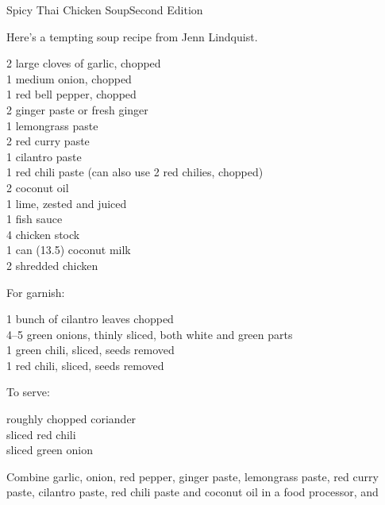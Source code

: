 
\begin{entry}{Spicy Thai Chicken Soup}{Second Edition}

\begin{open}
    Here's a tempting soup recipe from Jenn Lindquist.
\end{open}
\begin{ingredients}
    2 large cloves of garlic, chopped\\
    1 medium onion, chopped\\
    1 red bell pepper, chopped\\
    \SI{2}{\tblspoon} ginger paste or fresh ginger\\
    \SI{1}{\tblspoon} lemongrass paste\\
    \SI{2}{\tblspoon} red curry paste\\
    \SI{1}{\tblspoon} cilantro paste\\
    \SI{1}{\tblspoon} red chili paste (can also use 2 red chilies, chopped)\\
    \SI{2}{\tblspoon} coconut oil\\
    1 lime, zested and juiced\\
    \SI{1}{\tblspoon} fish sauce\\
    \SI{4}{\cup} chicken stock\\
    1 can (\SI{13.5}{\fluidounce}) coconut milk\\
    \SI{2}{\cup} shredded chicken
\end{ingredients}
For garnish:
\begin{ingredients}
    1 bunch of cilantro leaves chopped\\
    \numrange{4}{5} green onions, thinly sliced, both white and green parts\\
    1 green chili, sliced, seeds removed\\
    1 red chili, sliced, seeds removed
\end{ingredients}
To serve:
\begin{ingredients}
    roughly chopped coriander\\
    sliced red chili\\
    sliced green onion
\end{ingredients}
Combine garlic, onion, red pepper, ginger paste, lemongrass paste, red curry
paste, cilantro paste, red chili paste and coconut oil in a food processor, and

\end{entry}
